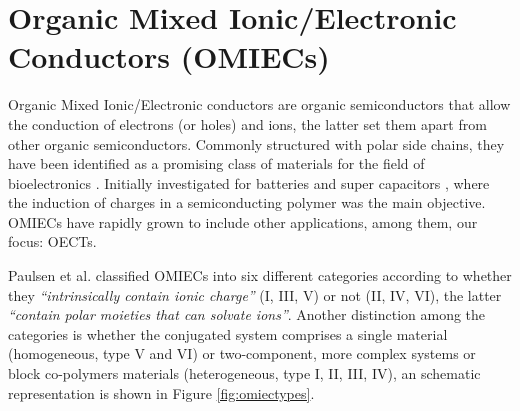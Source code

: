\section{Organic Mixed Ionic/Electronic Conductors (OMIECs)} \label{sec:omiecs}

Organic Mixed Ionic/Electronic conductors are organic semiconductors that allow the conduction of electrons (or holes) and ions, the latter set them apart from other organic semiconductors. %
Commonly structured with polar side chains, they have been identified as a promising class of materials for the field of bioelectronics
\cite{giovannittiEnergeticControlRedoxActive2020}. Initially investigated for batteries and super capacitors \cite{snookConductingpolymerbasedSupercapacitorDevices2011}
\cite{liangOrganicElectrodeMaterials2012}, where the induction of charges in a semiconducting polymer was the main objective. OMIECs have rapidly grown to include other applications, among them, our focus: OECTs.

Paulsen et al. classified OMIECs into six different categories according to whether they \textit{``intrinsically contain ionic charge''} (I, III, V) or not (II, IV, VI), the latter \textit{``contain polar moieties that can solvate ions''}. Another distinction among the categories is whether the conjugated system comprises a single material (homogeneous, type V and VI) or two-component, more complex systems or block co-polymers materials (heterogeneous, type I, II, III, IV)\cite{paulsenOrganicMixedIonic2020}, an schematic representation is shown in Figure \ref{fig:omiectypes}. %



